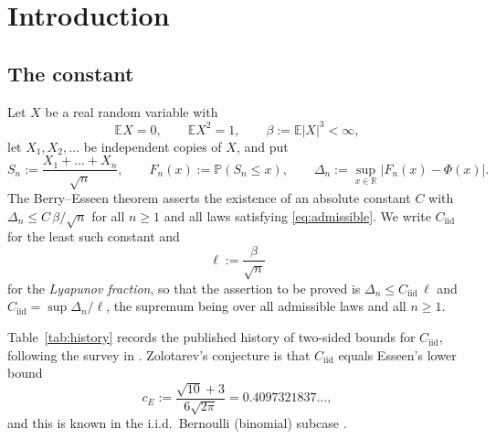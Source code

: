 \documentclass[10pt,a4paper]{article}
\theoremstyle{plain}
\theoremstyle{definition}
\newcommand{\R}{\mathbb{R}}
\newcommand{\E}{\mathbb{E}}
\newcommand{\PR}{\mathbb{P}}
\newcommand{\Cii}{C_{\mathrm{iid}}}
\begin{document}
\tableofcontents

\newpage

\section{Introduction}

\subsection{The constant}

Let $X$ be a real random variable with
\begin{equation}\label{eq:admissible}
  \E X = 0, \qquad \E X^2 = 1, \qquad \beta := \E|X|^3 < \infty ,
\end{equation}
let $X_1,X_2,\dots$ be independent copies of $X$, and put
\[
  S_n := \frac{X_1+\dots+X_n}{\sqrt n},
  \qquad F_n(x) := \PR(S_n \le x),
  \qquad \Delta_n := \sup_{x\in\R}\bigl|F_n(x)-\Phi(x)\bigr| .
\]
The Berry--Esseen theorem \cite{Berry1941,Esseen1942} asserts the existence of
an absolute constant $C$ with $\Delta_n \le C\,\beta/\sqrt n$ for all $n\ge1$
and all laws satisfying \eqref{eq:admissible}. We write $\Cii$ for the least
such constant and
\[
  \ell := \frac{\beta}{\sqrt n}
\]
for the \emph{Lyapunov fraction}, so that the assertion to be proved is
$\Delta_n \le \Cii\,\ell$ and $\Cii = \sup \Delta_n/\ell$, the supremum being
over all admissible laws and all $n\ge1$.

Table~\ref{tab:history} records the published history of two-sided bounds for
$\Cii$, following the survey in \cite{Tao2026}. Zolotarev's conjecture
\cite{Zolotarev1967} is that $\Cii$ equals Esseen's lower bound
\[
  c_E := \frac{\sqrt{10}+3}{6\sqrt{2\pi}} = 0.4097321837\ldots,
\]
and this is known in the i.i.d.\ Bernoulli (binomial) subcase
\cite{Schulz2016,Zolotukhin2018}.
\end{document}
